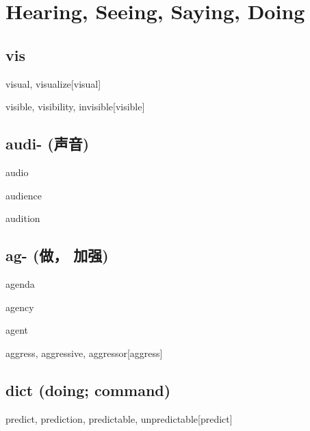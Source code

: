 \chapter{Hearing, Seeing, Saying, Doing}

\section{vis}
\begin{RefWord}{visual, visualize}[visual]
\end{RefWord}

\begin{RefWord}{visible, visibility, invisible}[visible]
\end{RefWord}

\section{audi- (声音)}
\begin{RefWord}{audio}
\end{RefWord}

\begin{RefWord}{audience}
\end{RefWord}

\begin{RefWord}{audition}
\end{RefWord}

\section{{ag- (做， 加强)}}

\begin{RefWord}{agenda}
\end{RefWord}

\begin{RefWord}{agency}
\end{RefWord}

\begin{RefWord}{agent}
\end{RefWord}

\begin{RefWord}{aggress, aggressive, aggressor}[aggress]
\end{RefWord}

\section{dict (doing; command)}

\begin{RefWord}{predict, prediction, predictable, unpredictable}[predict]
\end{RefWord}

